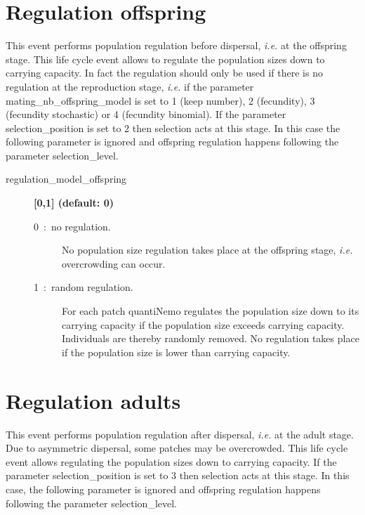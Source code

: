 \documentclass[letterpaper,12pt,oneside]{book}
\begin{document}
\section{Regulation offspring}\label{sec:RegulationOffspring}
This event performs population regulation before dispersal, \textit{i.e.} at the offspring stage. This life cycle event allows to regulate the population sizes down to carrying capacity. In fact the regulation should only be used if there is no regulation at the reproduction stage, \textit{i.e.} if the parameter \textsf{mating\_nb\_offspring\_model} is set to 1 (keep number), 2 (fecundity), 3 (fecundity stochastic) or 4 (fecundity binomial). If the parameter \textsf{selection\_position} is set to 2 then selection acts at this stage. In this case the following parameter is ignored and offspring regulation happens following the parameter \textsf{selection\_level}.  
\begin{description}
\item[regulation\_model\_offspring] \textbf{[0,1] (default: 0)}
\begin{description}
\item[0~:~no regulation.] No population size regulation takes place at the offspring stage, \textit{i.e.} overcrowding can occur.
\item[1~:~random regulation.] For each patch quantiNemo regulates the population size down to its carrying capacity if the population size exceeds carrying capacity. Individuals are thereby randomly removed. No regulation takes place if the population size is lower than carrying capacity.
\end{description}
\end{description}



\section{Regulation adults}\label{sec:RegulationAdults}
This event performs population regulation after dispersal, \textit{i.e.} at the adult stage. Due to asymmetric dispersal, some patches may be overcrowded. This life cycle event allows regulating the population sizes down to carrying capacity. If the parameter \textsf{selection\_position} is set to 3 then selection acts at this stage. In this case, the following parameter is ignored and offspring regulation happens following the parameter \textsf{selection\_level}.  
\end{document}
